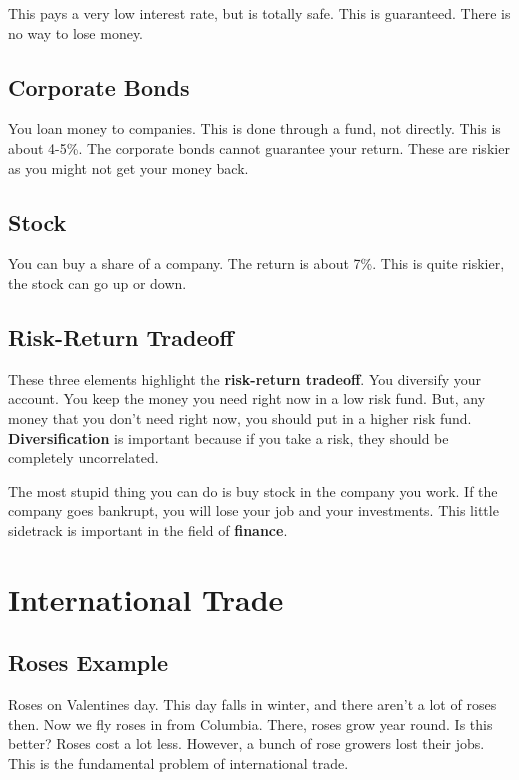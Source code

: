 \documentclass{article}
\begin{document}
This pays a very low interest rate, but is totally safe. This is guaranteed.
There is no way to lose money.

\subsection{Corporate Bonds}

You loan money to companies. This is done through a fund, not directly. This is
about 4-5\%. The corporate bonds cannot guarantee your return. These are riskier
as you might not get your money back.

\subsection{Stock}

You can buy a share of a company. The return is about 7\%. This is quite
riskier, the stock can go up or down.

\subsection{Risk-Return Tradeoff}

These three elements highlight the \textbf{risk-return tradeoff}. You diversify
your account. You keep the money you need right now in a low risk fund. But, any
money that you don't need right now, you should put in a higher risk fund.
\textbf{Diversification} is important because if you take a risk, they should be
completely uncorrelated.

The most stupid thing you can do is buy stock in the company you work. If the
company goes bankrupt, you will lose your job and your investments. This little
sidetrack is important in the field of \textbf{finance}. 

\section{International Trade}

\subsection{Roses Example}

Roses on Valentines day. This day falls in winter, and there aren't a lot of
roses then. Now we fly roses in from Columbia. There, roses grow year round. Is
this better? Roses cost a lot less. However, a bunch of rose growers lost their
jobs. This is the fundamental problem of international trade. 
\end{document}
